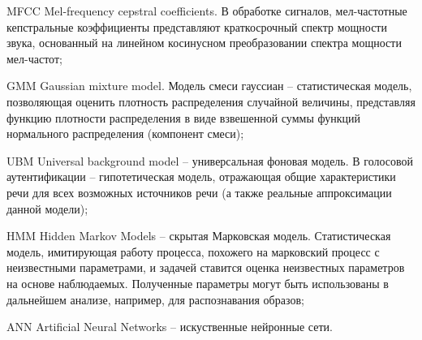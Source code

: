 \Abbreviations %
\begin{abbreviation}
\item[MFCC] Mel-frequency cepstral coefficients. В обработке сигналов, мел-частотные кепстральные коэффициенты представляют краткосрочный спектр мощности звука, основанный на линейном косинусном преобразовании спектра мощности мел-частот;
\item[GMM] Gaussian mixture model. Модель смеси гауссиан -- статистическая модель, позволяющая оценить плотность распределения случайной величины, представляя функцию плотности распределения в виде взвешенной суммы функций нормального распределения (компонент смеси);
\item[UBM] Universal background model -- универсальная фоновая модель. В голосовой аутентификации -- гипотетическая модель, отражающая общие характеристики речи для всех возможных источников речи (а также реальные аппроксимации данной модели);
\item[HMM] Hidden Markov Models -- скрытая Марковская модель. Статистическая модель, имитирующая работу процесса, похожего на марковский процесс с неизвестными параметрами, и задачей ставится оценка неизвестных параметров на основе наблюдаемых. Полученные параметры могут быть использованы в дальнейшем анализе, например, для распознавания образов;
\item[ANN] Artificial Neural Networks -- искуственные нейронные сети.
\end{abbreviation}

